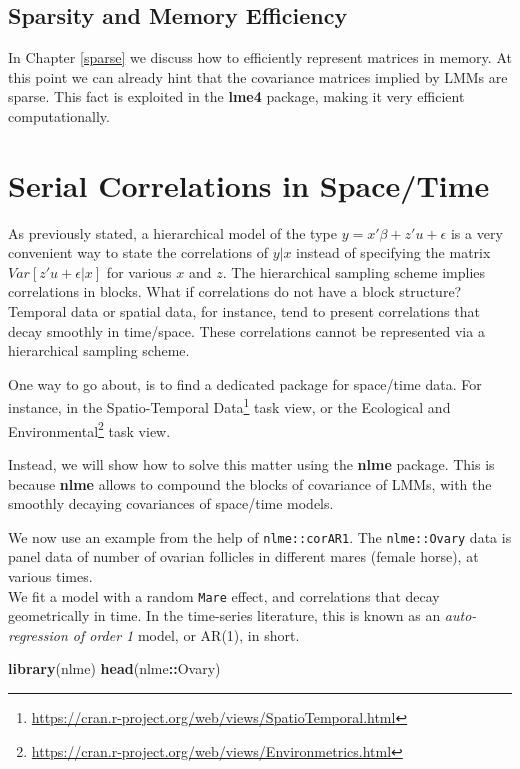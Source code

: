 \documentclass[]{book}
\newenvironment{Shaded}{\begin{snugshade}}{\end{snugshade}}
\newcommand{\KeywordTok}[1]{\textcolor[rgb]{0.13,0.29,0.53}{\textbf{#1}}}
\newcommand{\NormalTok}[1]{#1}
\newcommand{\OperatorTok}[1]{\textcolor[rgb]{0.81,0.36,0.00}{\textbf{#1}}}
\renewcommand{\href}[2]{#2\footnote{\url{#1}}}
\theoremstyle{definition}
\theoremstyle{definition}
\theoremstyle{definition}
\theoremstyle{remark}
\begin{document}
\hypertarget{sparsity-and-memory-efficiency}{%
\subsection{Sparsity and Memory Efficiency}\label{sparsity-and-memory-efficiency}}

In Chapter \ref{sparse} we discuss how to efficiently represent matrices in memory.
At this point we can already hint that the covariance matrices implied by LMMs are sparse. This fact is exploited in the \textbf{lme4} package, making it very efficient computationally.

\hypertarget{serial}{%
\section{Serial Correlations in Space/Time}\label{serial}}

As previously stated, a hierarchical model of the type \(y=x'\beta+z'u+\epsilon\) is a very convenient way to state the correlations of \(y|x\) instead of specifying the matrix \(Var[z'u+\epsilon|x]\) for various \(x\) and \(z\).
The hierarchical sampling scheme implies correlations in blocks.
What if correlations do not have a block structure?
Temporal data or spatial data, for instance, tend to present correlations that decay smoothly in time/space.
These correlations cannot be represented via a hierarchical sampling scheme.

One way to go about, is to find a dedicated package for space/time data.
For instance, in the \href{https://cran.r-project.org/web/views/SpatioTemporal.html}{Spatio-Temporal Data} task view, or the \href{https://cran.r-project.org/web/views/Environmetrics.html}{Ecological and Environmental} task view.

Instead, we will show how to solve this matter using the \textbf{nlme} package.
This is because \textbf{nlme} allows to compound the blocks of covariance of LMMs, with the smoothly decaying covariances of space/time models.

We now use an example from the help of \texttt{nlme::corAR1}.
The \texttt{nlme::Ovary} data is panel data of number of ovarian follicles in different mares (female horse), at various times.\\
We fit a model with a random \texttt{Mare} effect, and correlations that decay geometrically in time.
In the time-series literature, this is known as an \emph{auto-regression of order 1} model, or AR(1), in short.

\begin{Shaded}
\begin{Highlighting}[]
\KeywordTok{library}\NormalTok{(nlme)}
\KeywordTok{head}\NormalTok{(nlme}\OperatorTok{::}\NormalTok{Ovary)}
\end{Highlighting}
\end{Shaded}
\end{document}
